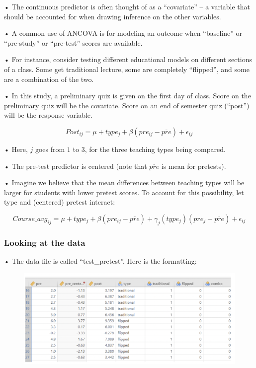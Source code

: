 \documentclass[
  letterpaper,
  DIV=11,
  numbers=noendperiod]{scrreprt}
\begin{document}
• The continuous predictor is often thought of as a ``covariate'' -- a
variable that should be accounted for when drawing inference on the
other variables.

• A common use of ANCOVA is for modeling an outcome when ``baseline'' or
``pre-study'' or ``pre-test'' scores are available.

• For instance, consider testing different educational models on
different sections of a class. Some get traditional lecture, some are
completely ``flipped'', and some are a combination of the two.

• In this study, a preliminary quiz is given on the first day of class.
Score on the preliminary quiz will be the covariate. Score on an end of
semester quiz (``post'') will be the response variable.

\[
Post_{ij} = \mu + type_j + \beta(pre_{ij} - \overline{pre}) + \epsilon_{ij}
\]

• Here, \(j\) goes from \(1\) to \(3\), for the three teaching types
being compared.

• The pre-test predictor is centered (note that \(\overline{pre}\) is
mean for pretests).

• Imagine we believe that the mean differences between teaching types
will be larger for students with lower pretest scores. To account for
this possibility, let type and (centered) pretest interact:

\[
Course\_avg_{ij} = \mu + type_j + \beta(pre_{ij} - \bar{pre}) + \gamma_j(type_j)(pre_j - \overline{pre}) + \epsilon_{ij}
\]

\hypertarget{looking-at-the-data}{%
\subsubsection{Looking at the data}\label{looking-at-the-data}}

• The data file is called ``test\_pretest''. Here is the formatting:

\begin{figure}

{\centering \includegraphics{images/Mod5_18.png}

}

\end{figure}
\end{document}
